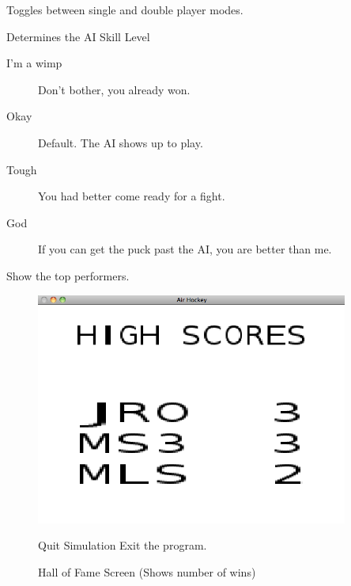 \documentclass[10pt]{report}
\begin{document}
\begin{description}
\begin{description}
\begin{figure}[!h]
         \label{fig:paddle}
         \end{figure}
   \end{description}
\item[AI Mode] Toggles between single and double player modes.
\item[Difficulty] Determines the AI Skill Level
   \begin{description}
   \item[I'm a wimp] Don't bother, you already won. 
   \item[Okay] Default. The AI shows up to play.
   \item[Tough] You had better come ready for a fight. 
   \item[God]  If you can get the puck past the AI, you are better than me.
   \end{description}
\item[Hall of Fame] Show the top performers.
         \begin{figure}[!h]
         \centering
         \includegraphics[height=3.0in]{hof.png}
         \caption{Hall of Fame Screen (Shows number of wins)}
         \label{fig:hof}
\item[Quit Simulation] Exit the program.
         \end{figure}
\end{description}

\clearpage
\end{document}
